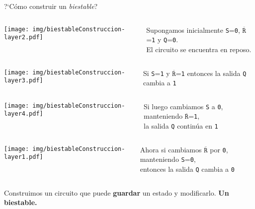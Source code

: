 \documentclass[aspectratio=169]{beamer}
\begin{document}
\begin{frame}[t]{?`Cómo construir un \emph{biestable}?}
    \vspace{0.1cm}
    \begin{columns}[c]
    \begin{center} \texttt{[image: img/biestableConstruccion-layer2.pdf]} \end{center}
    Supongamos inicialmente \texttt{S}=\texttt{0}, $\overline{\texttt{R}}$=\texttt{1} y \texttt{Q}=\texttt{0}.\\
    El circuito se encuentra en reposo.
    \end{columns}
    \vspace{0.2cm}\pause
    \begin{columns}[c]
    \begin{center} \texttt{[image: img/biestableConstruccion-layer3.pdf]} \end{center}
    Si \texttt{S}=\texttt{1} y $\overline{\texttt{R}}$=\texttt{1} entonces la salida \texttt{Q} cambia a \texttt{1}
    \end{columns}
    \vspace{0.2cm}\pause
    \begin{columns}[c]
    \begin{center} \texttt{[image: img/biestableConstruccion-layer4.pdf]} \end{center}
    Si luego cambiamos \texttt{S} a \texttt{0}, manteniendo $\overline{\texttt{R}}$=\texttt{1},\\ la salida \texttt{Q} continúa en \texttt{1}
    \end{columns}
    \vspace{0.2cm}\pause
    \begin{columns}[c]
    \begin{center} \texttt{[image: img/biestableConstruccion-layer1.pdf]} \end{center}
    Ahora si cambiamos $\overline{\texttt{R}}$ por \texttt{0}, manteniendo \texttt{S}=\texttt{0},\\ entonces la salida \texttt{Q} cambia a \texttt{0}
    \end{columns}
    \vspace{0.3cm}
    \textcolor{verdeuca}{Construimos un circuito que puede \textbf{guardar} un estado y modificarlo.} \textcolor{naranjauca}{\textbf{Un biestable.}}
\end{frame}
\end{document}

